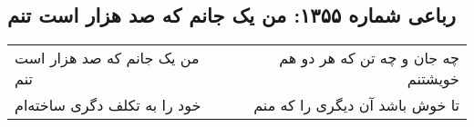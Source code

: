 \begin{center}
\section*{رباعی شماره ۱۳۵۵: من یک جانم که صد هزار است تنم}
\label{sec:1355}
\begin{longtable}{l p{0.5cm} r}
من یک جانم که صد هزار است تنم
&&
چه جان و چه تن که هر دو هم خویشتنم
\\
خود را به تکلف دگری ساخته‌ام
&&
تا خوش باشد آن دیگری را که منم
\\
\end{longtable}
\end{center}
